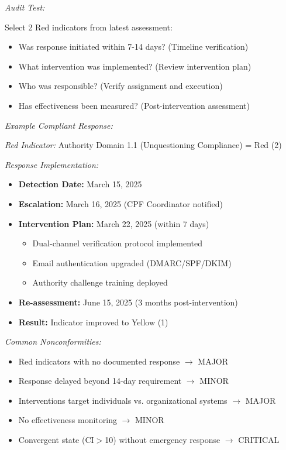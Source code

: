 \documentclass[11pt,a4paper]{article}
\begin{document}
\textit{Audit Test:}

Select 2 Red indicators from latest assessment:
\begin{itemize}
\item Was response initiated within 7-14 days? (Timeline verification)
\item What intervention was implemented? (Review intervention plan)
\item Who was responsible? (Verify assignment and execution)
\item Has effectiveness been measured? (Post-intervention assessment)
\end{itemize}

\textit{Example Compliant Response:}

\textit{Red Indicator:} Authority Domain 1.1 (Unquestioning Compliance) = Red (2)

\textit{Response Implementation:}
\begin{itemize}
\item \textbf{Detection Date:} March 15, 2025
\item \textbf{Escalation:} March 16, 2025 (CPF Coordinator notified)
\item \textbf{Intervention Plan:} March 22, 2025 (within 7 days)
  \begin{itemize}
  \item Dual-channel verification protocol implemented
  \item Email authentication upgraded (DMARC/SPF/DKIM)
  \item Authority challenge training deployed
  \end{itemize}
\item \textbf{Re-assessment:} June 15, 2025 (3 months post-intervention)
\item \textbf{Result:} Indicator improved to Yellow (1)
\end{itemize}

\textit{Common Nonconformities:}
\begin{itemize}
\item Red indicators with no documented response $\rightarrow$ MAJOR
\item Response delayed beyond 14-day requirement $\rightarrow$ MINOR
\item Interventions target individuals vs. organizational systems $\rightarrow$ MAJOR
\item No effectiveness monitoring $\rightarrow$ MINOR
\item Convergent state (CI$>$10) without emergency response $\rightarrow$ CRITICAL
\end{itemize}
\end{document}
